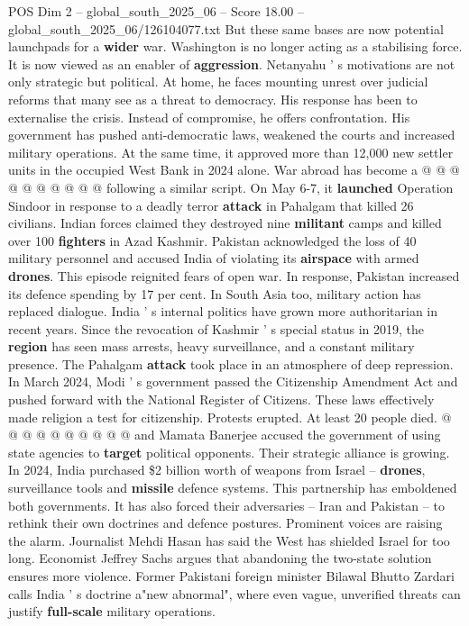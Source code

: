 \begin{textsample}{POS Dim 2 – global\_south\_2025\_06 – Score 18.00 – global\_south\_2025\_06/126104077.txt}
But these same bases are now potential launchpads for a \textbf{wider} war.
Washington is no longer acting as a stabilising force.
It is now viewed as an enabler of \textbf{aggression}.
Netanyahu ' s motivations are not only strategic but political.
At home, he faces mounting unrest over judicial reforms that many see as a threat to democracy.
His response has been to externalise the crisis.
Instead of compromise, he offers confrontation.
His government has pushed anti-democratic laws, weakened the courts and increased military operations.
At the same time, it approved more than 12,000 new settler units in the occupied West Bank in 2024 alone.
War abroad has become a @ @ @ @ @ @ @ @ @ @ following a similar script.
On May 6-7, it \textbf{launched} Operation Sindoor in response to a deadly terror \textbf{attack} in Pahalgam that killed 26 civilians.
Indian forces claimed they destroyed nine \textbf{militant} camps and killed over 100 \textbf{fighters} in Azad Kashmir.
Pakistan acknowledged the loss of 40 military personnel and accused India of violating its \textbf{airspace} with armed \textbf{drones}.
This episode reignited fears of open war.
In response, Pakistan increased its defence spending by 17 per cent.
In South Asia too, military action has replaced dialogue.
India ' s internal politics have grown more authoritarian in recent years.
Since the revocation of Kashmir ' s special status in 2019, the \textbf{region} has seen mass arrests, heavy surveillance, and a constant military presence.
The Pahalgam \textbf{attack} took place in an atmosphere of deep repression.
In March 2024, Modi ' s government passed the Citizenship Amendment Act and pushed forward with the National Register of Citizens.
These laws effectively made religion a test for citizenship.
Protests erupted.
At least 20 people died. @ @ @ @ @ @ @ @ @ @ and Mamata Banerjee accused the government of using state agencies to \textbf{target} political opponents.
Their strategic alliance is growing.
In 2024, India purchased \$2 billion worth of weapons from Israel -- \textbf{drones}, surveillance tools and \textbf{missile} defence systems.
This partnership has emboldened both governments.
It has also forced their adversaries -- Iran and Pakistan -- to rethink their own doctrines and defence postures.
Prominent voices are raising the alarm.
Journalist Mehdi Hasan has said the West has shielded Israel for too long.
Economist Jeffrey Sachs argues that abandoning the two-state solution ensures more violence.
Former Pakistani foreign minister Bilawal Bhutto Zardari calls India ' s doctrine a"new abnormal", where even vague, unverified threats can justify \textbf{full-scale} military operations.

\end{textsample}
